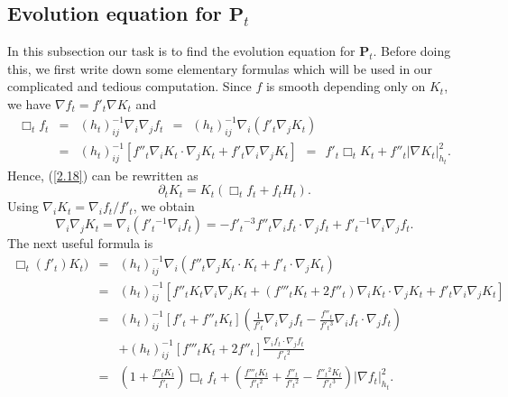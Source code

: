 \documentclass{amsart}
\theoremstyle{definition}
\theoremstyle{remark}
\numberwithin{equation}{section}
\begin{document}
\subsection{Evolution equation for $\mathbf{P}_{t}$}
In this subsection our task is to find the evolution equation for $\mathbf{P}_{t}$. 
Before doing this, we first write down some elementary formulas which will be used in
our complicated and tedious computation. Since $f$ is
smooth depending only on $K_{t}$, we have $\nabla f_{t}=f'_{t}\nabla K_{t}$ and
\begin{eqnarray}
\Box_{t} f_{t}&=&(h_{t})^{-1}_{ij}\nabla_{i}\nabla_{j}f_{t} \ \ = \ \ (h_{t})^{-1}_{ij}\nabla_{i}
\left(f'_{t}\nabla_{j}K_{t}\right)\nonumber\\
&=&(h_{t})^{-1}_{ij}\left[f''_{t}\nabla_{i}K_{t}\cdot\nabla_{j}K_{t}
+f'_{t}\nabla_{i}\nabla_{j}K_{t}\right]\label{3.4} \ \ = \ \ f'_{t}\Box_{t} K_{t}+f''_{t}|\nabla K_{t}|^{2}_{h_{t}}.
\end{eqnarray}
Hence, (\ref{2.18}) can be rewritten as
\begin{equation*}
\partial_{t}K_{t}=K_{t}\left(\Box_{t}f_{t}+f_{t}H_{t}\right).
\end{equation*}
Using $\nabla_{i}K_{t}=\nabla_{i}f_{t}/f'_{t}$, we obtain
\begin{equation}
\nabla_{i}\nabla_{j}K_{t}=\nabla_{i}\left(f'_{t}{}^{-1}\nabla_{i}f_{t}
\right)=-f'_{t}{}^{-3}f''_{t}\nabla_{i}f_{t}\cdot\nabla_{j}f_{t}
+f'_{t}{}^{-1}\nabla_{i}\nabla_{j}f_{t}.\label{3.5}
\end{equation}
The next useful formula is
\begin{eqnarray}
\Box_{t}(f'_{t})K_{t})&=&(h_{t})^{-1}_{ij}\nabla_{i}\left(f''_{t}\nabla_{j}K_{t}\cdot K_{t}+f'_{t}\cdot\nabla_{j}K_{t}\right)\nonumber\\
&=&(h_{t})^{-1}_{ij}\left[f''_{t}K_{t}\nabla_{i}\nabla_{j}K_{t}\right.+\left.(f'''_{t}K_{t}+2f''_{t})\nabla_{i}K_{t}\cdot\nabla_{j}K_{t}
+f'_{t}\nabla_{i}\nabla_{j}K_{t}\right]\nonumber\\
&=&(h_{t})^{-1}_{ij}\left[f'_{t}+f''_{t}K_{t}\right]
\left(\frac{1}{f'_{t}}\nabla_{i}\nabla_{j}f_{t}-\frac{f''_{t}}{f'_{t}{}^{3}}
\nabla_{i}f_{t}\cdot\nabla_{j}f_{t}\right)\nonumber\\
&&+(h_{t})^{-1}_{ij}\left[f'''_{t}K_{t}+2f''_{t}\right]
\frac{\nabla_{i}f_{t}\cdot\nabla_{j}f_{t}}{f'_{t}{}^{2}}\nonumber\\
&=&\left(1+\frac{f''_{t}K_{t}}{f'_{t}}\right)\Box_{t}f_{t}
+\left(\frac{f'''_{t}K_{t}}{f'_{t}{}^{2}}+\frac{f''_{t}}{f'_{t}{}^{2}}
-\frac{f''_{t}{}^{2}K_{t}}{f'_{t}{}^{3}}\right)|\nabla f_{t}|^{2}_{h_{t}}.
\label{3.6}
\end{eqnarray}
\end{document}
